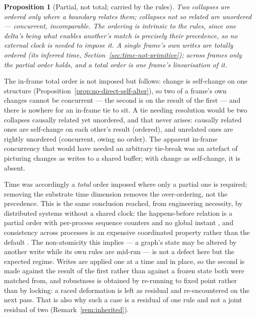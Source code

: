 \documentclass[11pt,a4paper]{article}
\newtheorem{proposition}[definition]{Proposition}
\theoremstyle{remark}\newtheorem{remark}[definition]{Remark}
\begin{document}
\begin{proposition}[Partial, not total; carried by the rules]\label{prop:partial-order}
Two collapses are ordered only where a boundary relates them; collapses not so related are unordered --- concurrent, incomparable. The ordering is intrinsic to the rules, since one delta's being what enables another's match is precisely their precedence, so no external clock is needed to impose it. A single frame's own writes are totally ordered (its inferred time, Section~\ref{sec:time-not-primitive}); across frames only the partial order holds, and a total order is one frame's linearisation of it.
\end{proposition}
The in-frame total order is not imposed but follows: change is self-change on one structure (Proposition~\ref{prop:no-direct-self-alter}), so two of a frame's own changes cannot be concurrent --- the second is on the result of the first --- and there is nowhere for an in-frame tie to sit. A tie needing resolution would be two collapses causally related yet unordered, and that never arises: causally related ones are self-change on each other's result (ordered), and unrelated ones are rightly unordered (concurrent, owing no order). The apparent in-frame concurrency that would have needed an arbitrary tie-break was an artefact of picturing changes as writes to a shared buffer; with change as self-change, it is absent.

Time was accordingly a \emph{total} order imposed where only a partial one is required; removing the substrate time dimension removes the over-ordering, not the precedence. This is the same conclusion reached, from engineering necessity, by distributed systems without a shared clock: the happens-before relation is a partial order with per-process sequence counters and no global instant \citep{lamport1978}, and consistency across processes is an expensive coordinated property rather than the default \citep{brewer2000}. The non-atomicity this implies --- a graph's state may be altered by another write while its own rules are mid-run --- is not a defect here but the expected regime. Writes are applied one at a time and in place, so the second is made against the result of the first rather than against a frozen state both were matched from, and robustness is obtained by re-running to fixed point rather than by locking: a raced deformation is left as residual and re-encountered on the next pass. That is also why such a case is a residual of one rule and not a joint residual of two (Remark~\ref{rem:inherited}).
\end{document}
